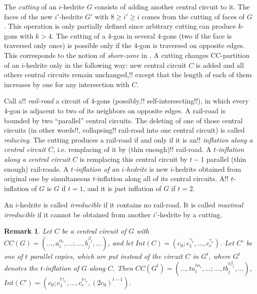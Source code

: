 \documentclass[12pt]{article}
\newtheorem{remark}{Remark}
\begin{document}
The {\em cutting} of an $i$-hedrite $G$ consists of adding another central 
circuit to it. The faces of the new $i'$-hedrite $G'$ with $8\geq i'\geq i$ 
comes from the cutting of faces of $G$. This operation is only partially
defined since arbitrary cutting can produce $k$-gons with $k>4$. The 
cutting of a $4$-gon in several $4$-gons (two if the face
is traversed only once) is possible only if the $4$-gon is traversed 
on opposite edges. This corresponds to the notion of {\it shore-zone} 
in \cite{DSt}.
A cutting changes CC-partition of an $i$-hedrite only in the following 
way: new central circuit $C$ is added and all others central circuits 
remain unchanged,!! except that the length of each of them increases by one 
for any intersection with $C$. 


Call a!! {\em rail-road} a circuit of $4$-gons (possibly,!! 
self-intersecting!!), 
in which every $4$-gon is adjacent to two of its neighbors on opposite
edges. A rail-road is bounded by two ``parallel'' central circuits.
The deleting of  one of those central circuits (in other words!!, 
collapsing!! 
rail-road into one central circuit) is called {\em reducing}.
The cutting produces a rail-road if and only if it is an!! {\em inflation 
along a central circuit $C$}, i.e. remplacing of it by 
(thin enough)!! 
rail-road. A {\em $t$-inflation along a central circuit $C$} is remplacing
this central circuit by $t-1$ parallel (thin enough) rail-roads.
A {\em $t$-inflation of an $i$-hedrite} is new $i$-hedrite
obtained from original one by simultaneous $t$-inflation along all
of its central circuits. 
A!! $t$-inflation of $G$ is $G$ if $t=1$, and it is just inflation of $G$ 
if $t=2$.


An $i$-hedrite is called {\em irreducible} if it contains no 
rail-road. It is called {\em maximal irreducible} if it cannot be
obtained from another $i'$-hedrite by a cutting.


\begin{remark}

Let $C$ be a central circuit of $G$ with $CC(G)=(...,a_i^{\alpha_i},...;...,b_j^{\beta_j},...)$,  and let 
$Int(C)=(c_0;c_1^{\gamma_1},...,c_r^{\gamma_r})$. Let $C'$ be one of 
$t$ parallel copies, which are put instead of the circuit $C$ in 
$G^t$, where $G^t$ denotes the $t$-inflation of $G$ along $C$.
Then $CC(G^t)=(...,ta_i^{t\alpha_i},...;...,tb_j^{t\beta_j},...)$,
$Int(C')=(c_0;c_1^{t\gamma_1},...,c_r^{t\gamma_r}, (2c_0)^{t-1})$.
\end{remark}
\end{document}
